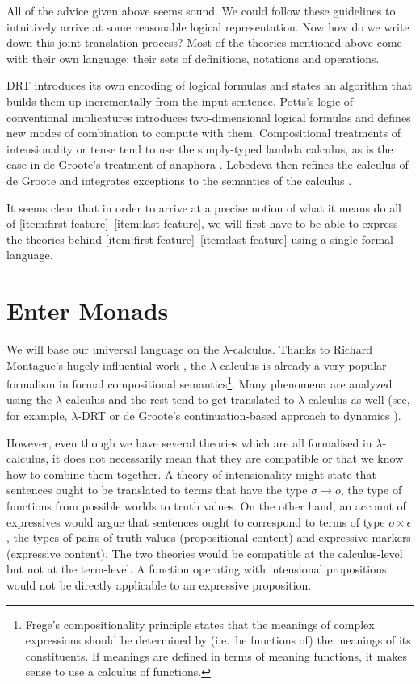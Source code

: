 All of the advice given above seems sound. We could follow these guidelines
to intuitively arrive at some reasonable logical representation. Now how do
we write down this joint translation process? Most of the theories
mentioned above come with their own language: their sets of definitions,
notations and operations.

DRT introduces its own encoding of logical formulas and states an algorithm
that builds them up incrementally from the input sentence. Potts's logic of
conventional implicatures introduces two-dimensional logical formulas and
defines new modes of combination to compute with them. Compositional
treatments of intensionality or tense tend to use the simply-typed lambda
calculus, as is the case in de Groote's treatment of anaphora
\cite{de2006towards}. Lebedeva then refines the calculus of de Groote and
integrates exceptions to the semantics of the calculus
\cite{lebedeva2012expression}.

It seems clear that in order to arrive at a precise notion of what it means
do all of \ref{item:first-feature}--\ref{item:last-feature}, we will first
have to be able to express the theories behind
\ref{item:first-feature}--\ref{item:last-feature} using a single formal
language.

\section{Enter Monads}

We will base our universal language on the $\lambda$-calculus. Thanks to
Richard Montague's hugely influential work \cite{montague1973proper}, the
$\lambda$-calculus is already a very popular formalism in formal
compositional semantics\footnote{Frege's compositionality principle states
  that the meanings of complex expressions should be determined by
  (i.e.\ be functions of) the meanings of its constituents. If meanings are
  defined in terms of meaning functions, it makes sense to use a calculus
  of functions.}. Many phenomena are analyzed using the $\lambda$-calculus
and the rest tend to get translated to $\lambda$-calculus as well (see, for
example, $\lambda$-DRT \cite{kuschert1995type} or de Groote's
continuation-based approach to dynamics \cite{de2006towards}).

However, even though we have several theories which are all formalised in
$\lambda$-calculus, it does not necessarily mean that they are compatible
or that we know how to combine them together. A theory of intensionality
might state that sentences ought to be translated to terms that have the
type $\sigma \to o$, the type of functions from possible worlds to truth
values. On the other hand, an account of expressives would argue that
sentences ought to correspond to terms of type $o \times \epsilon$, the
types of pairs of truth values (propositional content) and expressive
markers (expressive content). The two theories would be compatible at the
calculus-level but not at the term-level. A function operating with
intensional propositions would not be directly applicable to an expressive
proposition.

